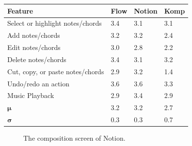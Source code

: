 			\begin{table}[H]
			  \centering
			   \label{tab:compare-i4}
			  \begin{tabular}{|p{6cm}|R{1.5cm}|R{1.5cm}|R{1.5cm}|}
			  	\hline 
			  	\textbf{Feature} & \textbf{Flow} & \textbf{Notion} & \textbf{Komp} \\ \hline

				Select or highlight notes/chords 		& 3.4 & 3.1 & 3.1 \\ \hline
				Add notes/chords 							& 3.2 & 3.2 & 2.4 \\ \hline
				Edit notes/chords 							& 3.0 & 2.8 & 2.2 \\ \hline
				Delete notes/chords 						& 3.4 & 3.1 & 3.2 \\ \hline
				Cut, copy, or paste notes/chords 	& 2.9 & 3.2 & 1.4 \\ \hline
				Undo/redo an action 						& 3.6 & 3.6 & 3.3 \\ \hline
				Music Playback 								& 2.9 & 3.4 & 2.9 \\ \hline

				\begin{math}\bm{\mu}\end{math} 		& 3.2 & 3.2 & 2.7 \\ \hline
				\begin{math}\bm{\sigma}\end{math} 	& 0.3 & 0.3 & 0.7 \\ \hline
			  \end{tabular}
			\end{table}

			\begin{figure}[H]
				\centering
			    \caption{The composition screen of Notion.}
			    \label{fig:notion}
			\end{figure} 

